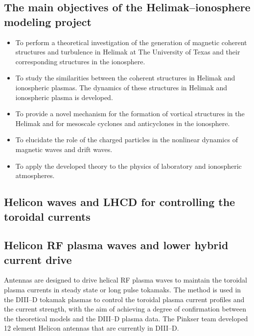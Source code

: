 \documentclass[a4paper,openany,12pt]{book}
\begin{document}
\subsection*{The main objectives of the Helimak--ionosphere modeling project}
\begin{itemize}
  \item To perform a theoretical investigation of the generation of magnetic coherent structures and turbulence in Helimak at The University of Texas and their corresponding structures in the ionosphere. 
  \item To study the similarities between the coherent structures in Helimak and ionospheric plasmas. The dynamics of these structures in Helimak and ionospheric plasma is developed. 
  \item To provide a novel mechanism for the formation of vortical structures in the Helimak and for mesoscale cyclones and anticyclones in the ionosphere. 
  \item To elucidate the role of the charged particles in the nonlinear dynamics of magnetic waves and drift waves. 
  \item To apply the developed theory to the physics of laboratory and ionospheric atmospheres.
\end{itemize}  

\subsection{Helicon waves and LHCD for controlling the toroidal currents}

\subsection*{Helicon RF plasma waves and lower hybrid current drive}

Antennas are designed to drive helical RF plasma waves to maintain the toroidal plasma currents in steady state or long pulse tokamaks. The method is used in the DIII--D tokamak plasmas to control the toroidal plasma current profiles and the current strength, with the aim of achieving a degree of confirmation between the theoretical models and the DIII--D plasma data. The Pinkser team developed 12 element Helicon antennas that are currently in DIII--D. 
\end{document}
